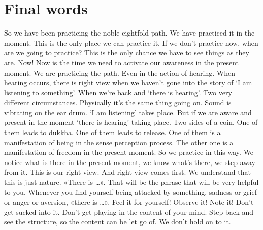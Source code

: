 \documentclass[letterpaper,10pt,english]{sphinxmanual}
\begin{document}
\chapter{Final words}
\label{\detokenize{final:final-words}}\label{\detokenize{final::doc}}
\sphinxAtStartPar
So we have been practicing the noble eightfold path. We have practiced
it in the moment. This is the only place we can practice it. If we don’t practice now, when are we going to practice? This is the only chance we have to
see things as they are. Now! Now is the time we need to activate our awareness in the present moment. We are practicing the path. Even in the action
of hearing. When hearing occurs, there is right view when we haven’t gone
into the story of ‘I am listening to something’. When we’re back and ‘there
is hearing’. Two very different circumstances. Physically it’s the same thing
going on. Sound is vibrating on the ear drum. ‘I am listening’ takes place.
But  if  we  are  aware  and  present  in  the  moment  ‘there  is  hearing’  taking
place. Two sides of a coin. One of them leads to dukkha. One of them leads
to release. One of them is a manifestation of being in the sense perception
process. The other one is a manifestation of freedom in the present moment.
So we practice in this way. We notice what is there in the present moment,
we  know  what’s  there,  we  step  away  from  it.  This  is  our  right  view. And
right view comes first. We understand that this is just nature. «There is …».
That will be the phrase that will be very helpful to you. Whenever you find
yourself being attacked by something, sadness or grief or anger or aversion,
«there is …». Feel it for yourself! Observe it! Note it! Don’t get sucked into
it. Don’t get playing in the content of your mind. Step back and see the structure,   so the content can be let go of. We don’t hold on to it.
\end{document}
